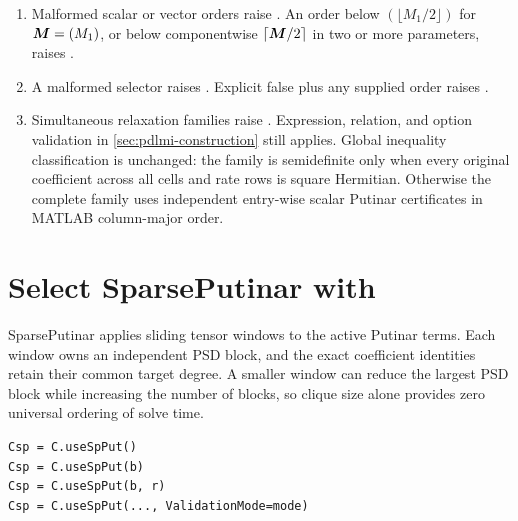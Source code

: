\remarkshead
\begin{enumerate}[leftmargin=*]
  \item Malformed scalar or vector orders raise . An order below $(\lfloor M_1/2\rfloor)$ for $\boldsymbol{M}=(M_1)$, or below componentwise $\lceil\boldsymbol{M}/2\rceil$ in two or more parameters, raises . \item A malformed selector raises . Explicit false plus any supplied order raises . \item Simultaneous relaxation families raise . Expression, relation, and option validation in \cref{sec:pdlmi-construction} still applies. Global inequality classification is unchanged: the family is semidefinite only when every original coefficient across all cells and rate rows is square Hermitian. Otherwise the complete family uses independent entry-wise scalar Putinar certificates in MATLAB column-major order.
\end{enumerate}

\section[Select SparsePutinar with \texorpdfstring{\codeplain{useSpPut}}{useSpPut}]{%
Select SparsePutinar with\\[-0.15em] \texorpdfstring{}{useSpPut}}
\label{sec:pdlmi-sparse-putinar}

SparsePutinar applies sliding tensor windows to the active Putinar terms. Each window owns an independent PSD block, and the exact coefficient identities retain their common target degree. A smaller window can reduce the largest PSD block while increasing the number of blocks, so clique size alone provides zero universal ordering of solve time.

\syntaxhead
\begin{lstlisting}[style=dpsyntax]
Csp = C.useSpPut()
Csp = C.useSpPut(b)
Csp = C.useSpPut(b, r)
Csp = C.useSpPut(..., ValidationMode=mode)
\end{lstlisting}

